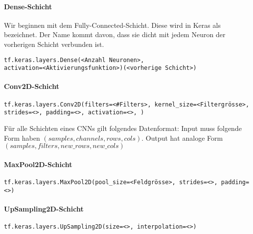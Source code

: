 \paragraph{Dense-Schicht}
Wir beginnen mit dem Fully-Connected-Schicht. Diese wird in Keras als
 bezeichnet. Der Name kommt davon, dass sie dicht mit jedem Neuron
der vorherigen Schicht verbunden ist.
\begin{verbatim}
tf.keras.layers.Dense(<Anzahl Neuronen>,
activation=<Aktivierungsfunktion>)(<vorherige Schicht>)
\end{verbatim}

\paragraph{Conv2D-Schicht}

\begin{verbatim}
tf.keras.layers.Conv2D(filters=<#Filters>, kernel_size=<Filtergrösse>,
strides=<>, padding=<>, activation=<>, )
\end{verbatim}
Für alle Schichten eines CNNs gilt folgendes Datenformat:
Input muss folgende Form haben $(samples, channels, rows, cols)$. Output hat
analoge Form $(samples, filters, new\_rows, new\_cols)$

\paragraph{MaxPool2D-Schicht}

\begin{verbatim}
tf.keras.layers.MaxPool2D(pool_size=<Feldgrösse>, strides=<>, padding=<>)
\end{verbatim}


\paragraph{UpSampling2D-Schicht}

\begin{verbatim}
tf.keras.layers.UpSampling2D(size=<>, interpolation=<>)
\end{verbatim}


